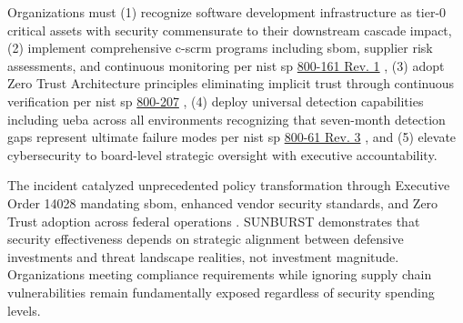 Organizations must (1) recognize software development infrastructure as tier-0 critical assets with security commensurate to their downstream cascade impact, (2) implement comprehensive \gls{c-scrm} programs including \gls{sbom}, supplier risk assessments, and continuous monitoring per \gls{nist} \gls{sp} \href{https://csrc.nist.gov/pubs/sp/800/161/r1/upd1/final}{800-161 Rev. 1} \cite{boyens_cybersecurity_2024}, (3) adopt Zero Trust Architecture principles eliminating implicit trust through continuous verification per \gls{nist} \gls{sp} \href{https://csrc.nist.gov/pubs/sp/800/207/final}{800-207} \cite{rose_zero_2020}, (4) deploy universal detection capabilities including \gls{ueba} \cite{litan_market_2015} across all environments recognizing that seven-month detection gaps represent ultimate failure modes per \gls{nist} \gls{sp} \href{https://csrc.nist.gov/pubs/sp/800/61/r3/final}{800-61 Rev. 3} \cite{nelson_incident_2025}, and (5) elevate cybersecurity to board-level strategic oversight with executive accountability.

The incident catalyzed unprecedented policy transformation through Executive Order 14028 mandating \gls{sbom}, enhanced vendor security standards, and Zero Trust adoption across federal operations \cite{biden2021}. SUNBURST demonstrates that security effectiveness depends on strategic alignment between defensive investments and threat landscape realities, not investment magnitude. Organizations meeting compliance requirements while ignoring supply chain vulnerabilities remain fundamentally exposed regardless of security spending levels.
